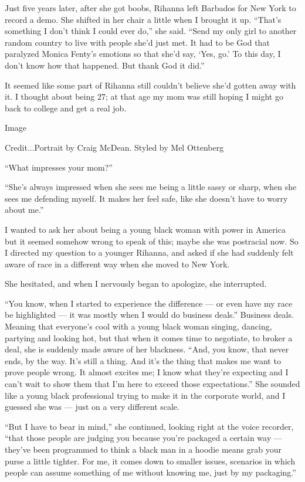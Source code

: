 Just five years later, after she got boobs, Rihanna left Barbados for
New York to record a demo. She shifted in her chair a little when I
brought it up. ``That's something I don't think I could ever do,'' she
said. ``Send my only girl to another random country to live with people
she'd just met. It had to be God that paralyzed Monica Fenty's emotions
so that she'd say, `Yes, go.' To this day, I don't know how that
happened. But thank God it did.''

It seemed like some part of Rihanna still couldn't believe she'd gotten
away with it. I thought about being 27; at that age my mom was still
hoping I might go back to college and get a real job.

Image

Credit...Portrait by Craig McDean. Styled by Mel Ottenberg

``What impresses your mom?''

``She's always impressed when she sees me being a little sassy or sharp,
when she sees me defending myself. It makes her feel safe, like she
doesn't have to worry about me.''

I wanted to ask her about being a young black woman with power in
America but it seemed somehow wrong to speak of this; maybe she was
postracial now. So I directed my question to a younger Rihanna, and
asked if she had suddenly felt aware of race in a different way when she
moved to New York.

She hesitated, and when I nervously began to apologize, she interrupted.

``You know, when I started to experience the difference --- or even have
my race be highlighted --- it was mostly when I would do business
deals.'' Business deals. Meaning that everyone's cool with a young black
woman singing, dancing, partying and looking hot, but that when it comes
time to negotiate, to broker a deal, she is suddenly made aware of her
blackness. ``And, you know, that never ends, by the way. It's still a
thing. And it's the thing that makes me want to prove people wrong. It
almost excites me; I know what they're expecting and I can't wait to
show them that I'm here to exceed those expectations.'' She sounded like
a young black professional trying to make it in the corporate world, and
I guessed she was --- just on a very different scale.

``But I have to bear in mind,'' she continued, looking right at the
voice recorder, ``that those people are judging you because you're
packaged a certain way --- they've been programmed to think a black man
in a hoodie means grab your purse a little tighter. For me, it comes
down to smaller issues, scenarios in which people can assume something
of me without knowing me, just by my packaging.''

